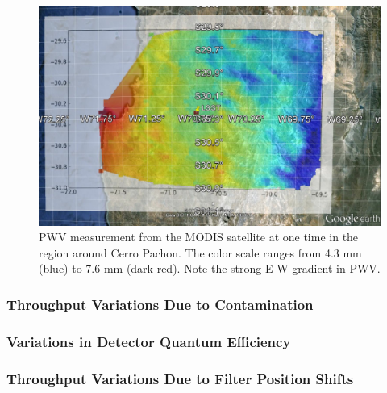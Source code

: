 \documentclass[12pt,preprint]{aastex}
\begin{document}
\begin{figure}[htbp]
\includegraphics[width=6in]{AtmoFigs/PWV_satellite_2}
\caption{ {PWV measurement from the MODIS satellite at one time in the region
around Cerro Pachon.   The color scale ranges from 4.3 mm (blue) to 7.6 mm (dark red). Note the strong E-W gradient in PWV.}
\label{fig:PWV_satellite} }
\end{figure}


\subsubsection{Throughput Variations Due to Contamination}

\subsubsection{Variations in Detector Quantum Efficiency}

\subsubsection{Throughput Variations Due to Filter Position Shifts}
\end{document}
